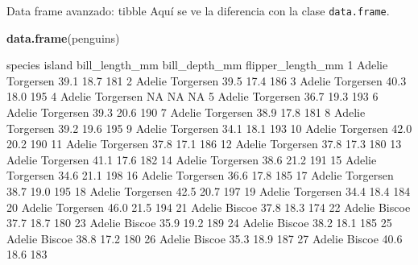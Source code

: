 \documentclass[
  ignorenonframetext,
  aspectratio=169]{beamer}
\newenvironment{Shaded}{\begin{snugshade}}{\end{snugshade}}
\newcommand{\FunctionTok}[1]{\textcolor[rgb]{0.13,0.29,0.53}{\textbf{#1}}}
\newcommand{\NormalTok}[1]{#1}
\let\oldverbatim\verbatim
\let\endoldverbatim\endverbatim
\renewenvironment{verbatim}{\tiny\oldverbatim}{\endoldverbatim}
\begin{document}
\begin{frame}[fragile]{Data frame avanzado: tibble}
\label{data-frame-avanzado-tibble-6}
Aquí se ve la diferencia con la clase \texttt{data.frame}.

\begin{Shaded}
\begin{Highlighting}[]
\FunctionTok{data.frame}\NormalTok{(penguins)}
\end{Highlighting}
\end{Shaded}

\begin{verbatim}
      species    island bill_length_mm bill_depth_mm flipper_length_mm
1      Adelie Torgersen           39.1          18.7               181
2      Adelie Torgersen           39.5          17.4               186
3      Adelie Torgersen           40.3          18.0               195
4      Adelie Torgersen             NA            NA                NA
5      Adelie Torgersen           36.7          19.3               193
6      Adelie Torgersen           39.3          20.6               190
7      Adelie Torgersen           38.9          17.8               181
8      Adelie Torgersen           39.2          19.6               195
9      Adelie Torgersen           34.1          18.1               193
10     Adelie Torgersen           42.0          20.2               190
11     Adelie Torgersen           37.8          17.1               186
12     Adelie Torgersen           37.8          17.3               180
13     Adelie Torgersen           41.1          17.6               182
14     Adelie Torgersen           38.6          21.2               191
15     Adelie Torgersen           34.6          21.1               198
16     Adelie Torgersen           36.6          17.8               185
17     Adelie Torgersen           38.7          19.0               195
18     Adelie Torgersen           42.5          20.7               197
19     Adelie Torgersen           34.4          18.4               184
20     Adelie Torgersen           46.0          21.5               194
21     Adelie    Biscoe           37.8          18.3               174
22     Adelie    Biscoe           37.7          18.7               180
23     Adelie    Biscoe           35.9          19.2               189
24     Adelie    Biscoe           38.2          18.1               185
25     Adelie    Biscoe           38.8          17.2               180
26     Adelie    Biscoe           35.3          18.9               187
27     Adelie    Biscoe           40.6          18.6               183

\end{verbatim}
\end{frame}
\end{document}
